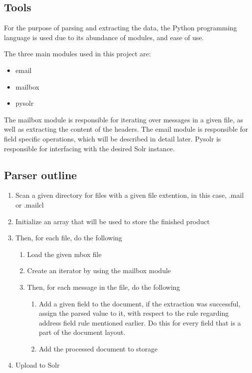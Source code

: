 \documentclass[a4paper,english]{report}
\begin{document}
\subsection{Tools}

For the purpose of parsing and extracting the data, the Python programming language is used due to its abundance of modules, and ease of use.

The three main modules used in this project are: 

\begin{itemize}
	\item email 
	\item mailbox 
	\item pysolr 
\end{itemize}
The mailbox module is responsible for iterating over messages in a given file, as well as extracting the content of the headers. The email module is responsible for field specific operations, which will be described in detail later.
Pysolr is responsible for interfacing with the desired Solr instance.

\subsection{Parser outline}

\begin{enumerate}
	\item Scan a given directory for files with a given file extention, in this case, .mail or .mailcl
	\item Initialize an array that will be used to store the finished product 
	\item Then, for each file, do the following
\begin{enumerate}

\item Load the given mbox file 
\item Create an iterator by using the mailbox module 
\item Then, for each message in the file, do the following 
\begin{enumerate}


	\item Add a given field to the document, if the extraction was successful, assign the parsed value to it, with respect to the rule regarding address field rule  mentioned earlier. Do this 		            for every field that is a part of the document layout.

          \item Add the processed document to storage 
 	


\end{enumerate}
\end{enumerate}
	

	\item Upload to Solr	
\end{enumerate}
\end{document}
